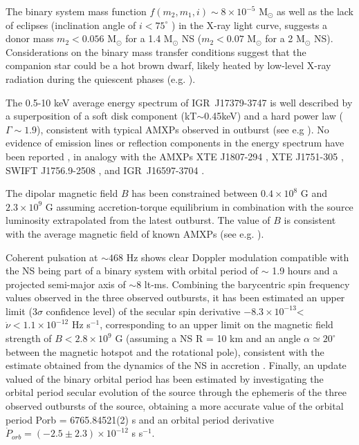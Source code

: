 \documentclass[graybox]{svmult}
\begin{document}
The binary system mass function $f(m_2 , m_1 , i) \sim 8\times 10^{-5}$ M$_{\odot}$ as well as the lack of eclipses (inclination angle of $i<75^\circ$ ) in the X-ray light curve, suggests a donor mass $m_2 < 0.056$ M$_\odot$ for a 1.4 M$_\odot$ NS ($m_2< 0.07$ M$_\odot$ for a 2 M$_\odot$ NS). Considerations on the binary mass transfer conditions suggest that the companion star could be a hot brown dwarf, likely heated by low-level X-ray radiation during the quiescent phases (e.g. \cite{Sanna2018b,Bildsten2001,Galloway2005b}). 

The 0.5-10 keV average energy spectrum of IGR~J17379-3747 is well described by a superposition of a soft disk component (kT$\sim$0.45keV) and a hard power law ($\Gamma\sim1.9$), consistent with typical AMXPs observed in outburst (see e.g \cite{Gierlinski2005,Papitto2009,Falanga2012}). No evidence of emission lines or reflection components in the energy spectrum have been reported \cite{Sanna2018b}, in analogy with the AMXPs XTE J1807-294 \cite{Falanga2005a}, XTE J1751-305 \cite{Miller2003}, SWIFT J1756.9-2508 \cite{Sanna2018d}, and IGR~J16597-3704 
\cite{Sanna2018a}. 

The dipolar magnetic field $B$ has been constrained between $0.4\times 10^{8}$ G and $2.3\times 10^{9}$ G assuming accretion-torque equilibrium in combination with the source luminosity extrapolated from the latest outburst. The value of $B$ is consistent with the average magnetic field of known AMXPs (see e.g. \cite{Mukherjee2015,Degenaar2017}).

Coherent pulsation at $\sim 468$ Hz shows clear Doppler modulation compatible with the NS being part of a binary system with orbital period of $\sim$ 1.9 hours and a projected semi-major axis of $\sim8$ lt-ms. Combining the barycentric spin frequency values observed in the three observed outbursts, it has been estimated an upper limit (3$\sigma$ confidence level) of the secular spin derivative $-8.3\times 10^{-13}$< $\dot{\nu}< 1.1\times 10^{-12}$ Hz s$^{-1}$, corresponding to an upper limit on the magnetic field strength of $B < 2.8\times 10^{9}$ G (assuming a NS R = 10 km and an angle $\alpha\simeq20^{\circ}$ between the magnetic hotspot and the rotational pole), consistent with the estimate obtained from the dynamics of the NS in accretion \cite{Sanna2018b}.
Finally, an update valued of the binary orbital period has been estimated by investigating the orbital period secular evolution of the source through the ephemeris of the three observed outbursts of the source, obtaining a more accurate value of the orbital period Porb = 6765.84521(2) s and an orbital period derivative $\dot{P}_{orb} = (-2.5\pm 2.3)\times 10^{-12}$ s s$^{-1}$.
\end{document}
